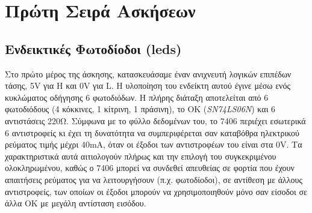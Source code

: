 \documentclass[a4paper,10pt]{article} \usepackage{anysize}
\begin{document}


\section*{Πρώτη Σειρά Ασκήσεων} \setcounter{section}{1}
\subsection{Ενδεικτικές Φωτοδίοδοι (leds)} Στο πρώτο μέρος της άσκησης,
κατασκευάσαμε έναν ανιχνευτή λογικών επιπέδων τάσης, 5V για H και 0V για L. Η
υλοποίηση του ενδείκτη αυτού έγινε μέσω ενός κυκλώματος οδήγησης 6 φωτοδιόδων.
Η πλήρης διάταξη αποτελείται από 6 φωτοδιόδους (4 κόκκινες, 1 κίτρινη, 1
πράσινη), το ΟΚ (\textit{SN74LS06N}) και 6 αντιστάσεις 220Ω. Σύμφωνα με το φύλλο δεδομένων
του, το 7406 περιέχει εσωτερικά 6 αντιστροφείς κι έχει τη δυνατότητα να
συμπεριφέρεται σαν καταβόθρα ηλεκτρικού ρεύματος τιμής μέχρι 40mA, όταν οι
έξοδοι των αντιστροφέων του είναι στα 0V. Τα χαρακτηριστικά αυτά αιτιολογούν
πλήρως και την επιλογή του συγκεκριμένου ολοκληρωμένου, καθώς ο 7406 μπορεί να
συνδεθεί απευθείας σε φορτία που έχουν απαιτήσεις ρεύματος για να
λειτουργήσουν (π.χ. φωτοδίοδοι), σε αντίθεση με άλλους αντιστροφείς, των
οποίων οι έξοδοι μπορούν να χρησιμοποιηθούν μόνο σαν είσοδοι σε άλλα ΟΚ με
μεγάλη αντίσταση εισόδου.
\end{document}
